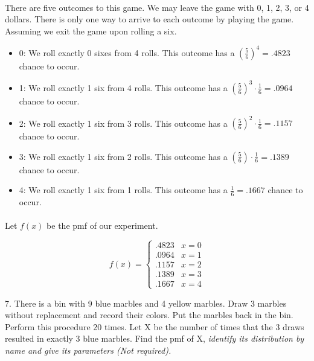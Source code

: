 \documentclass{article}
\begin{document}
\paragraph{}There are five outcomes to this game. We may leave the game with 0, 1, 2, 3, or 4 dollars.
There is only one way to arrive to each outcome by playing the game. Assuming we exit the game upon
rolling a six.
\begin{itemize}
    \item 0: We roll exactly 0 sixes from 4 rolls. This outcome has a $(\frac{5}{6})^{4} = .4823$ 
        chance to occur.
\item 1: We roll exactly 1 six from 4 rolls. This outcome has a $(\frac{5}{6})^{3}\cdot\frac{1}{6} = .0964$ chance
    to occur.
    \item 2: We roll exactly 1 six from 3 rolls. This outcome has a $(\frac{5}{6})^{2}\cdot\frac{1}{6} = .1157$ chance
    to occur.

    \item 3: We roll exactly 1 six from 2 rolls. This outcome has a $(\frac{5}{6})\cdot\frac{1}{6} = .1389$ chance
    to occur.

    \item 4: We roll exactly 1 six from 1 rolls. This outcome has a $\frac{1}{6} = .1667$ chance
    to occur.
 
    \end{itemize}
\paragraph{}Let $f(x)$ be the pmf of our experiment.

    \[ f(x) = \begin{cases} 
          .4823 & x = 0 \\
          .0964 & x = 1 \\
          .1157 & x = 2 \\
          .1389 & x = 3 \\
          .1667 & x = 4
       \end{cases}
    \]

\vspace{5mm}

7. There is a bin with 9 blue marbles and 4 yellow marbles. Draw 3 marbles without
replacement and record their colors. Put the marbles back in the bin. Perform this
procedure 20 times. Let X be the number of times that the 3 draws resulted in exactly
3 blue marbles. Find the pmf of X, \emph{identify its distribution by name and give its
parameters (Not required).}
\end{document}
